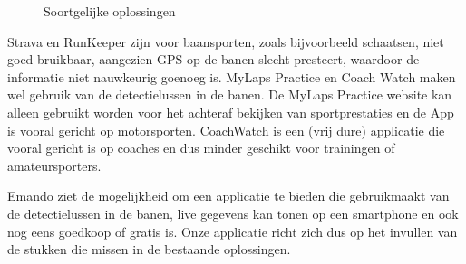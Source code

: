 \begin{figure}[ht]

\caption{Soortgelijke oplossingen}
\label{fig:soortgelijke-oplossingen}
\end{figure}

Strava en RunKeeper zijn voor baansporten, zoals bijvoorbeeld schaatsen, niet goed bruikbaar, aangezien GPS op de banen slecht presteert, waardoor de informatie niet nauwkeurig goenoeg is. MyLaps Practice en Coach Watch maken wel gebruik van de detectielussen in de banen. De MyLaps Practice website kan alleen gebruikt worden voor het achteraf bekijken van sportprestaties en de App is vooral gericht op motorsporten. CoachWatch is een (vrij dure) applicatie die vooral gericht is op coaches en dus minder geschikt voor trainingen of amateursporters.

Emando ziet de mogelijkheid om een applicatie te bieden die gebruikmaakt van de detectielussen in de banen, live gegevens kan tonen op een smartphone en ook nog eens goedkoop of gratis is. Onze applicatie richt zich dus op het invullen van de stukken die missen in de bestaande oplossingen.